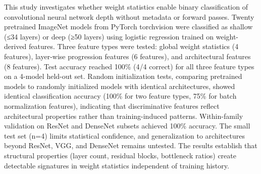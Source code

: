 
This study investigates whether weight statistics enable binary classification of convolutional neural network depth without metadata or forward passes. Twenty pretrained ImageNet models from PyTorch torchvision were classified as shallow (≤34 layers) or deep (≥50 layers) using logistic regression trained on weight-derived features. Three feature types were tested: global weight statistics (4 features), layer-wise progression features (6 features), and architectural features (8 features). Test accuracy reached 100\% (4/4 correct) for all three feature types on a 4-model held-out set. Random initialization tests, comparing pretrained models to randomly initialized models with identical architectures, showed identical classification accuracy (100\% for two feature types, 75\% for batch normalization features), indicating that discriminative features reflect architectural properties rather than training-induced patterns. Within-family validation on ResNet and DenseNet subsets achieved 100\% accuracy. The small test set (n=4) limits statistical confidence, and generalization to architectures beyond ResNet, VGG, and DenseNet remains untested. The results establish that structural properties (layer count, residual blocks, bottleneck ratios) create detectable signatures in weight statistics independent of training history.
